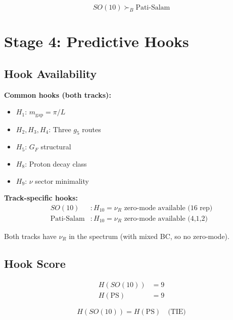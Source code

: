 \documentclass[11pt,a4paper]{article}
\begin{document}
\begin{equation}
\label{eq:burden-winner}
\boxed{SO(10) \succ_B \text{Pati-Salam}}
\end{equation}

\section{Stage 4: Predictive Hooks}
\label{sec:stage4-impl}

\subsection{Hook Availability}
\label{subsec:hook-avail}

\textbf{Common hooks (both tracks):}
\begin{itemize}
\item $H_1$: $m_{\text{gap}} = \pi/L$ \checkmark
\item $H_2, H_3, H_4$: Three $g_5$ routes \checkmark
\item $H_5$: $G_F$ structural \checkmark
\item $H_8$: Proton decay class \checkmark
\item $H_9$: $\nu$ sector minimality \checkmark
\end{itemize}

\textbf{Track-specific hooks:}
\begin{align}
\label{eq:hook-so10-nur}
SO(10) &: H_{10} = \nu_R \text{ zero-mode available (16 rep)} \\
\label{eq:hook-ps-nur}
\text{Pati-Salam} &: H_{10} = \nu_R \text{ zero-mode available (4,1,2)}
\end{align}

Both tracks have $\nu_R$ in the spectrum (with mixed BC, so no zero-mode).

\subsection{Hook Score}
\label{subsec:hook-score}

\begin{align}
\label{eq:hook-so10}
H(SO(10)) &= 9 \\
\label{eq:hook-ps}
H(\text{PS}) &= 9
\end{align}

\begin{equation}
\label{eq:hook-tie}
\boxed{H(SO(10)) = H(\text{PS}) \quad \text{(TIE)}}
\end{equation}
\end{document}
